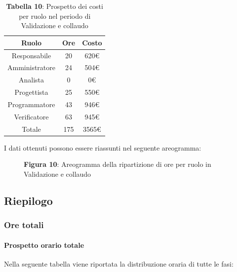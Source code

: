 \begin{table}[H]
	\centering
	\renewcommand{\arraystretch}{1.5}
	\begin{tabular}{|c|c|c|}
		\hline
		\rowcolor{lighter-grayer}
		Ruolo & Ore & Costo \\
		\hline
		Responsabile & 20 & 620\euro \\
		\hline
		Amministratore & 24 & 504\euro \\
		\hline
		Analista & 0 & 0\euro \\
		\hline
		Progettista & 25 & 550\euro \\
		\hline
		Programmatore & 43 & 946\euro \\
		\hline
		Verificatore & 63 & 945\euro \\
		\hline
		Totale & 175 &  3565\euro \\
		\hline
	\end{tabular}
\caption*{\textbf{Tabella 10}: Prospetto dei costi per ruolo nel periodo di Validazione e collaudo\\}
\end{table}

I dati ottenuti possono essere riassunti nel seguente areogramma:


\begin{figure}[H]
	\centering
	\caption*{\textbf{Figura 10}: Areogramma della ripartizione di ore per ruolo in Validazione e collaudo}
	\label{fig:Figura10}
\end{figure}

\subsection{Riepilogo}
\subsubsection{Ore totali}
\paragraph{Prospetto orario totale}
Nella seguente tabella viene riportata la distribuzione oraria di tutte le fasi:


